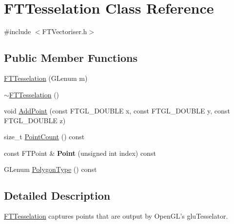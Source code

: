 \hypertarget{class_f_t_tesselation}{
\section{FTTesselation Class Reference}
\label{class_f_t_tesselation}
}


{\ttfamily \#include $<$FTVectoriser.h$>$}

\subsection*{Public Member Functions}
\begin{DoxyCompactItemize}
\item 
\hyperlink{class_f_t_tesselation_a8ae81852ffa0dfb1bc65e85dc6d35df2}{FTTesselation} (GLenum m)
\item 
\hyperlink{class_f_t_tesselation_a55bd008edbf969720fa3dc083bce1ac0}{$\sim$FTTesselation} ()
\item 
void \hyperlink{class_f_t_tesselation_a204a9e646cee25f374faad125d71d5e6}{AddPoint} (const FTGL\_\-DOUBLE x, const FTGL\_\-DOUBLE y, const FTGL\_\-DOUBLE z)
\item 
size\_\-t \hyperlink{class_f_t_tesselation_aa3cb26a53c3534576339f946acdc0cc7}{PointCount} () const 
\item 
\hypertarget{class_f_t_tesselation_a964ae8f16f216ca545f44a087f31e827}{
const FTPoint \& {\bfseries Point} (unsigned int index) const }
\label{class_f_t_tesselation_a964ae8f16f216ca545f44a087f31e827}

\item 
GLenum \hyperlink{class_f_t_tesselation_a06c290061a75bad0d38a2d5b2f6b09a1}{PolygonType} () const 
\end{DoxyCompactItemize}


\subsection{Detailed Description}
\hyperlink{class_f_t_tesselation}{FTTesselation} captures points that are output by OpenGL's gluTesselator. 

